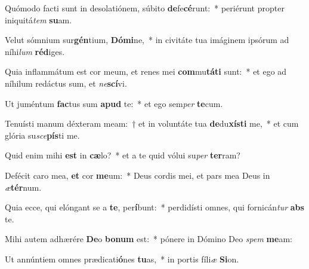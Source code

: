 \item Quómodo facti sunt in desolatiónem, súbito \textbf{de}fe\textbf{cé}runt:~* periérunt propter iniquitá\textit{tem} \textbf{su}am.
\item Velut sómnium sur\textbf{gén}tium, \textbf{Dó}\textbf{mi}ne,~* in civitáte tua imáginem ipsórum ad níhi\textit{lum} \textbf{réd}iges.
\item Quia inflammátum est cor meum, et renes mei \textbf{com}mu\textbf{tá}\textbf{ti} sunt:~* et ego ad níhilum redáctus sum, et \textit{ne}\textbf{scí}vi.
\item Ut juméntum \textbf{fac}tus sum \textbf{a}\textbf{pud} te:~* et ego sem\textit{per} \textbf{te}cum.
\item Tenuísti manum déxteram meam:~† et in voluntáte tua \textbf{de}du\textbf{xís}\textbf{ti} me,~* et cum glória su\textit{sce}\textbf{pís}ti me.
\item Quid enim mihi \textbf{est} in \textbf{cæ}lo?~* et a te quid vólui su\textit{per} \textbf{ter}ram?
\item Defécit caro mea, \textbf{et} cor \textbf{me}um:~* Deus cordis mei, et pars mea Deus in \textit{æ}\textbf{tér}num.
\item Quia ecce, qui elóngant se a \textbf{te}, per\textbf{í}bunt:~* perdidísti omnes, qui fornicán\textit{tur} \textbf{abs} te.
\item Mihi autem adhærére \textbf{De}o \textbf{bo}\textbf{num} est:~* pónere in Dómino Deo \textit{spem} \textbf{me}am:
\item Ut annúntiem omnes prædicati\textbf{ó}nes \textbf{tu}as,~* in portis fíli\textit{æ} \textbf{Si}on.

